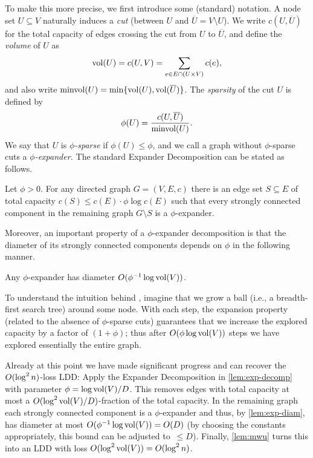 \documentclass[letterpaper,11pt]{article}
\begin{document}
To make this more precise, we first introduce some (standard) notation. A node set $U \subseteq V$ naturally induces a \emph{cut} (between $U$ and $\overline U = V \setminus U$). We write $c(U, \overline U)$ for the total capacity of edges crossing the cut from $U$ to $\overline U$, and define the \emph{volume} of $U$ as
\begin{equation*}
	\operatorname{vol}(U) = c(U, V) = \sum_{e \in E \cap (U \times V)} c(e),
\end{equation*}
and also write $\operatorname{minvol}(U) = \min\lbrace\operatorname{vol}(U), \operatorname{vol}(\overline U)\rbrace$. The \emph{sparsity} of the cut $U$ is defined by
\begin{equation*}
	\phi(U) = \frac{c(U, \overline U)}{\operatorname{minvol}(U)}.
\end{equation*}
We say that $U$ is \emph{$\phi$-sparse} if $\phi(U) \leq \phi$, and we call a graph without $\phi$-sparse cuts a \emph{$\phi$-expander.} The standard Expander Decomposition can be stated as follows.

\begin{lemma} \label{lem:exp-decomp}
Let $\phi > 0$. For any directed graph $G = (V, E, c)$ there is an edge set $S \subseteq E$ of total capacity $c(S) \leq c(E) \cdot \phi \log c(E)$ such that every strongly connected component in the remaining graph $G \setminus S$ is a $\phi$-expander.
\end{lemma}

Moreover, an important property of a $\phi$-expander decomposition is that the diameter of its strongly connected components depends on $\phi$ in the following manner. 

\begin{lemma} \label{lem:exp-diam}
Any $\phi$-expander has diameter $O(\phi^{-1} \log \operatorname{vol}(V))$.
\end{lemma}

To understand the intuition behind , imagine that we grow a ball (i.e., a breadth-first search tree) around some node. With each step, the expansion property (related to the absence of $\phi$-sparse cuts) guarantees that we increase the explored capacity by a factor of $(1 + \phi)$; thus after $O(\phi \log \operatorname{vol}(V))$ steps we have explored essentially the entire graph.

Already at this point we have made significant progress and can recover the $O(\log^2 n)$-loss LDD: Apply the Expander Decomposition in \cref{lem:exp-decomp} with parameter $\phi = \log \operatorname{vol}(V) / D$. This removes edges with total capacity at most a $O(\log^2 \operatorname{vol}(V) / D)$-fraction of the total capacity. In the remaining graph each strongly connected component is a $\phi$-expander and thus, by \cref{lem:exp-diam}, has diameter at most $O(\phi^{-1} \log\operatorname{vol}(V)) = O(D)$ (by choosing the constants appropriately, this bound can be adjusted to~$\leq D$). Finally, \cref{lem:mwu} turns this into an LDD with loss $O(\log^2 \operatorname{vol}(V)) = O(\log^2 n)$.
\end{document}
